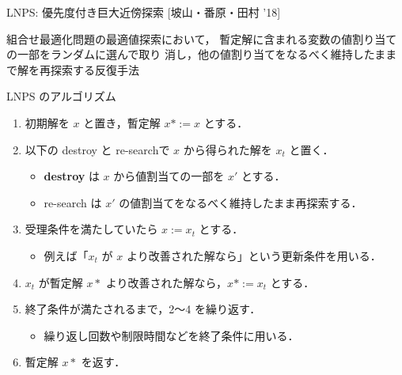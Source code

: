 \documentclass[11pt,dvipdfmx]{beamer}
\begin{document}
\begin{frame}{LNPS: 優先度付き巨大近傍探索 [坡山・番原・田村 '18]}
  \begin{alertblock}{}\centering
    組合せ最適化問題の最適値探索において，
    暫定解に含まれる変数の値割り当ての一部をランダムに選んで取り
    消し，他の値割り当てをなるべく維持したままで解を再探索する反復手法
  \end{alertblock}
  \pause
  \begin{block}{\small LNPS のアルゴリズム}
    \begin{enumerate}
      \compress
      \item 初期解を $x$ と置き，暫定解 $x* := x$ とする．
      \item 以下の destroy と re-searchで $x$ から得られた解を $x_t$ と置く．
      \begin{itemize}
        \compress
        \item \alert{\bf destroy} は $x$ から値割当ての一部を $x'$ とする．
        \item re-search は $x'$ の値割当てをなるべく維持したまま再探索する．
      \end{itemize}
      \item 受理条件を満たしていたら $x := x_t$ とする．
      \begin{itemize}
        \item 例えば「$x_t$ が $x$ より改善された解なら」という更新条件を用いる．
      \end{itemize}
      \item $x_t$ が暫定解 $x*$ より改善された解なら，$x* := x_t$ とする．
      \item 終了条件が満たされるまで，2〜4 を繰り返す．
      \begin{itemize}
        \item 繰り返し回数や制限時間などを終了条件に用いる．
      \end{itemize}
      \item 暫定解 $x*$ を返す．
    \end{enumerate}
  \end{block}
\end{frame}
\end{document}
